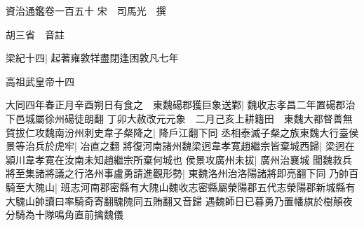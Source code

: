 資治通鑑卷一百五十
宋　司馬光　撰

胡三省　音註

梁紀十四|{
	起著雍敦䍧盡閉逢困敦凡七年}


高祖武皇帝十四

大同四年春正月辛酉朔日有食之　東魏碭郡獲巨象送鄴|{
	魏收志孝昌二年置碭郡治下邑城屬徐州碭徒朗翻}
丁卯大赦改元元象　二月己亥上耕籍田　東魏大都督善無賀拔仁攻魏南汾州刺史韋子粲降之|{
	降戶江翻下同}
丞相泰滅子粲之族東魏大行臺侯景等治兵於虎牢|{
	冶直之翻}
將復河南諸州魏梁迥韋孝寛趙繼宗皆棄城西歸|{
	梁迥在潁川韋孝寛在汝南未知趙繼宗所棄何城也}
侯景攻廣州未拔|{
	廣州治襄城}
聞魏救兵將至集諸將議之行洛州事盧勇請進觀形勢|{
	東魏洛州治洛陽諸將即亮翻下同}
乃帥百騎至大隗山|{
	班志河南郡密縣有大隗山魏收志密縣屬滎陽郡五代志滎陽郡新城縣有大騩山帥讀曰率騎奇寄翻騩隗同五賄翻又音歸}
遇魏師日已暮勇乃置幡旗於樹顛夜分騎為十隊鳴角直前擒魏儀

